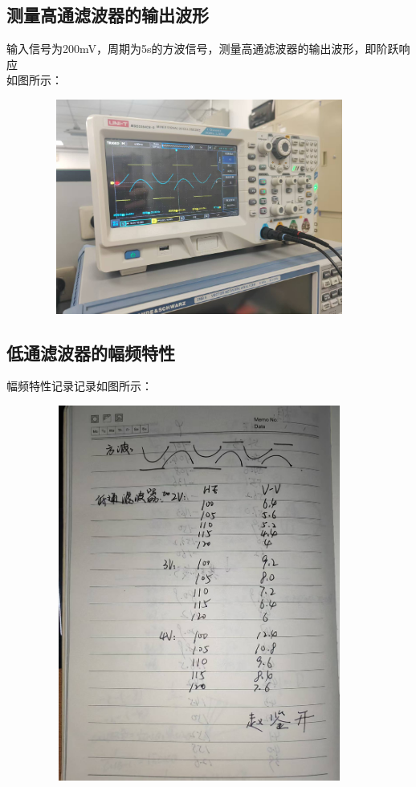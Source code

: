 \documentclass{article}
\begin{document}
\subsection{测量高通滤波器的输出波形}
输入信号为200mV，周期为5s的方波信号，测量高通滤波器的输出波形，即阶跃响应\\
如图所示：
\begin{figure}[htbp]
    \centering
    \includegraphics[width=300pt,height=200pt]{bobo.jpg}
\end{figure}

\subsection{低通滤波器的幅频特性}
幅频特性记录记录如图所示：
\begin{figure}
    \centering
    \includegraphics[width=300pt,height=350pt]{ditong.jpg}
\end{figure}
\end{document}
